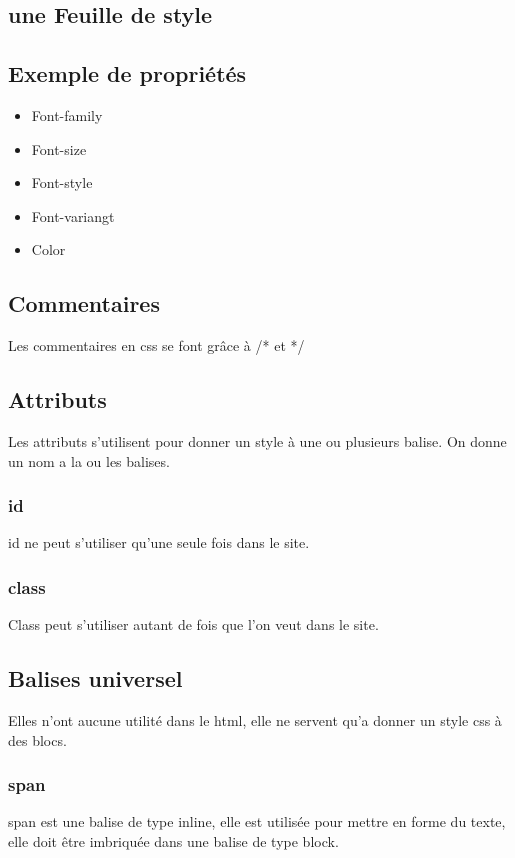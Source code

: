 \documentclass[12pt,a4paper,openany]{article}
\begin{document}
			\subsection{une Feuille de style}
			
			
		\subsection{Exemple de propriétés}
		\begin{itemize}
			\item Font-family
			\item Font-size
			\item Font-style
			\item Font-variangt
			\item Color
		\end{itemize}	
		\subsection{Commentaires}
			Les commentaires en css se font grâce à /* et */
		\subsection{Attributs}
			Les attributs s'utilisent pour donner un style à une ou plusieurs 
			balise. On donne un nom a la ou les balises.
			\subsubsection{id}
				id ne peut s'utiliser qu'une seule fois dans le site.  
			
			
			\subsubsection{class}
				Class peut s'utiliser autant de fois que l'on veut dans le site.
			
			
			\subsection{Balises universel}
				Elles n'ont aucune utilité dans le html, elle ne servent qu'a 
				donner un style css à des blocs.
				\subsubsection{span}
				span est une balise de type inline, elle est utilisée pour mettre
				en forme du texte, elle doit être imbriquée dans une balise de type
				block.
\end{document}
